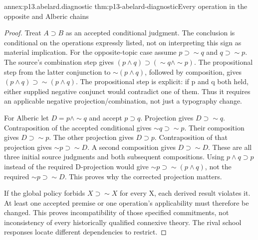 \begin{annexitem}{annex:p13.abelard.diagnostic}
 {thm:p13-abelard-diagnostic}{Every operation in the opposite and Alberic chains}
\begin{proof}
Treat \(A\supset B\) as an accepted conditional judgment.
The conclusion is conditional on the operations expressly
listed, not on interpreting this sign as material implication.
For the opposite-topic case assume
\(p\supset\sim q\) and \(q\supset\sim p\).
The source's combination step gives
\((p\land q)\supset(\sim q\land\sim p)\).
The propositional step from the latter conjunction
to \(\sim(p\land q)\), followed by composition,
gives \((p\land q)\supset\sim(p\land q)\).
The propositional step is explicit: if p and q both
held, either supplied negative conjunct would contradict
one of them. Thus it requires an applicable negative
projection/combination, not just a typography change.

For Alberic let \(D=p\land\sim q\) and accept \(p\supset q\).
Projection gives \(D\supset\sim q\).
Contraposition of the accepted conditional gives
\(\sim q\supset\sim p\).
Their composition gives \(D\supset\sim p\).
The other projection gives \(D\supset p\).
Contraposition of that projection gives
\(\sim p\supset\sim D\).
A second composition gives \(D\supset\sim D\).
These are all three initial source judgments and
both subsequent compositions.
Using \(p\land q\supset p\) instead of the required
D-projection would give \(\sim p\supset\sim(p\land q)\),
not the required \(\sim p\supset\sim D\).
This proves why the corrected projection matters.

If the global policy forbids \(X\supset\sim X\)
for every X, each derived result violates it.
At least one accepted premise or one operation's
applicability must therefore be changed.
This proves incompatibility of those specified commitments,
not inconsistency of every historically qualified
connexive theory. The rival school responses locate
different dependencies to restrict.
\end{proof}
\end{annexitem}

